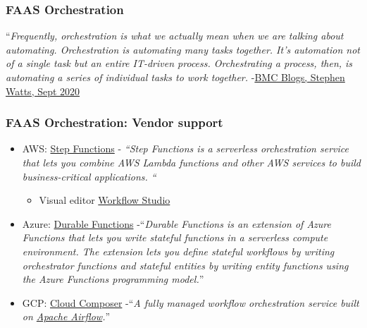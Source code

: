 \documentclass[11pt,aspectratio=169]{beamer}
\begin{document}
\begin{nrcanFrame}
  \frametitle{FAAS Orchestration}
  ``\textit{Frequently, orchestration is what we actually mean when we
    are talking about automating. Orchestration is automating many
    tasks together. It’s automation not of a single task but an entire
    IT-driven process. Orchestrating a process, then, is automating a
    series of individual tasks to work together.}
  -\href{https://www.bmc.com/blogs/it-orchestration-vs-automation-whats-the-difference/}
       {BMC Blogs, Stephen Watts, Sept 2020}

\end{nrcanFrame}

\begin{nrcanFrame}
  \frametitle{FAAS Orchestration: Vendor support}
  \begin{itemize}
  \item AWS:
    \href{https://docs.aws.amazon.com/step-functions/index.html}
         {Step Functions} -
         \textit{``Step Functions is a serverless
      orchestration service that lets you combine AWS Lambda functions
      and other AWS services to build business-critical
      applications. ``}
    \begin{itemize}
    \item Visual editor
      \href{https://docs.aws.amazon.com/step-functions/latest/dg/workflow-studio.html}
      {Workflow Studio}
    \end{itemize}
  \item Azure:
    \href{https://docs.microsoft.com/en-us/azure/azure-functions/durable/}
         {Durable Functions}
         -``\textit{Durable Functions is an extension of Azure Functions that lets you write stateful functions in a serverless compute environment. The extension lets you define stateful workflows by writing orchestrator functions and stateful entities by writing entity functions using the Azure Functions programming model.}''
  \item GCP:
    \href{https://cloud.google.com/composer/}
         {Cloud Composer}
         -``\textit{A fully managed workflow orchestration service
           built on
           \href{https://airflow.apache.org/}{Apache Airflow}.}''
  \end{itemize}
\end{nrcanFrame}


\nrcanLastFrame
\end{document}
